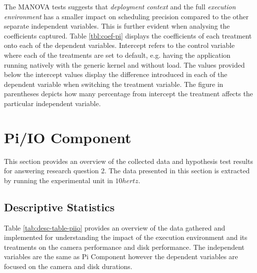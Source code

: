 The MANOVA tests suggests that \textit{deployment context} and the full \textit{execution environment} has a smaller impact on scheduling precision compared to the other separate independent variables. This is further evident when analysing the coefficients captured. Table \ref{tbl:coef-pi} displays the coefficients of each treatment onto each of the dependent variables. Intercept refers to the control variable where each of the treatments are set to default, e.g. having the application running natively with the generic kernel and without load. The values provided below the intercept values display the difference introduced in each of the dependent variable when switching the treatment variable. The figure in parentheses depicts how many percentage from intercept the treatment affects the particular independent variable.




\section{Pi/IO Component}
\label{section:analysis-piiocomponent}

This section provides an overview of the collected data and hypothesis test results for answering research question 2. The data presented in this section is extracted by running the experimental unit in $10 hertz$.

\subsection{Descriptive Statistics}

Table \ref{tab:desc-table-piio} provides an overview of the data gathered and implemented for understanding the impact of the execution environment and its treatments on the camera performance and disk performance. The independent variables are the same as Pi Component however the dependent variables are focused on the camera and disk durations.


